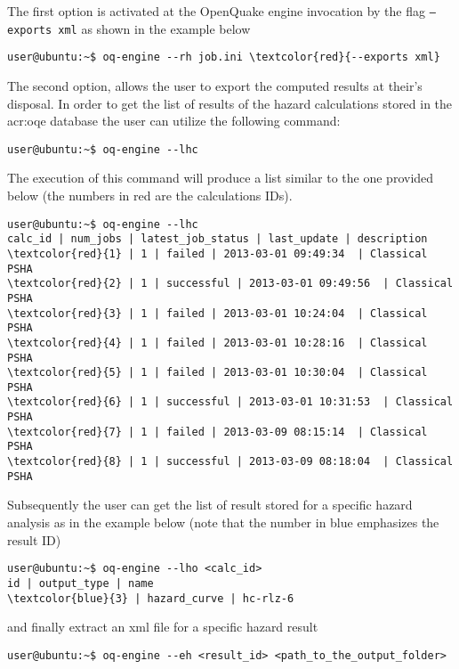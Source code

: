 The first option is activated at the OpenQuake engine invocation by 
the flag \texttt{--exports xml} as shown in the example below
\begin{Verbatim}[frame=single, commandchars=\\\{\}, fontsize=\small]
user@ubuntu:~$ oq-engine --rh job.ini \textcolor{red}{--exports xml}
\end{Verbatim}

The second option, allows the user to export the computed results at 
their's disposal.
In order to get the list of results of the hazard calculations stored 
in the \gls{acr:oqe} database the user can utilize the following command:
\begin{Verbatim}[frame=single, commandchars=\\\{\}, fontsize=\small]
user@ubuntu:~$ oq-engine --lhc
\end{Verbatim}
The execution of this command will produce a list similar to the 
one provided below (the numbers in red are the calculations IDs).
\begin{Verbatim}[frame=single, commandchars=\\\{\}, fontsize=\small]
user@ubuntu:~$ oq-engine --lhc
calc_id | num_jobs | latest_job_status | last_update | description
\textcolor{red}{1} | 1 | failed | 2013-03-01 09:49:34  | Classical PSHA
\textcolor{red}{2} | 1 | successful | 2013-03-01 09:49:56  | Classical PSHA
\textcolor{red}{3} | 1 | failed | 2013-03-01 10:24:04  | Classical PSHA
\textcolor{red}{4} | 1 | failed | 2013-03-01 10:28:16  | Classical PSHA
\textcolor{red}{5} | 1 | failed | 2013-03-01 10:30:04  | Classical PSHA
\textcolor{red}{6} | 1 | successful | 2013-03-01 10:31:53  | Classical PSHA
\textcolor{red}{7} | 1 | failed | 2013-03-09 08:15:14  | Classical PSHA
\textcolor{red}{8} | 1 | successful | 2013-03-09 08:18:04  | Classical PSHA
\end{Verbatim}
Subsequently the user can get the list of result stored for a specific 
hazard analysis as in the example below (note that the number in blue 
emphasizes the result ID)
\begin{Verbatim}[frame=single, commandchars=\\\{\}, fontsize=\small]
user@ubuntu:~$ oq-engine --lho <calc_id>
id | output_type | name
\textcolor{blue}{3} | hazard_curve | hc-rlz-6
\end{Verbatim}
and finally extract an xml file for a specific hazard result 
\begin{Verbatim}[frame=single, commandchars=\\\{\}, fontsize=\small]
user@ubuntu:~$ oq-engine --eh <result_id> <path_to_the_output_folder>
\end{Verbatim}


